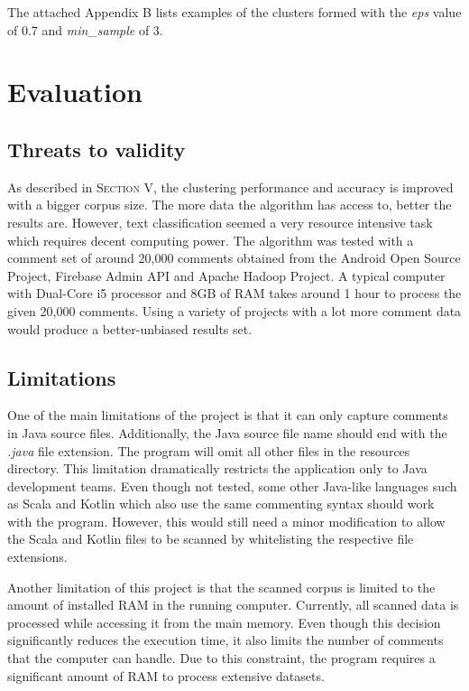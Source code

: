 \documentclass[conference]{IEEEtran}
\begin{document}
The attached Appendix B lists examples of the clusters formed with the \textit{eps} value of 0.7 and \textit{min\_sample} of 3.

\section{Evaluation}

\subsection{Threats to validity}

As described in \textsc{Section V}, the clustering performance and accuracy is improved with a bigger corpus size. The more data the algorithm has access to, better the results are. However, text classification seemed a very resource intensive task which requires decent computing power. The algorithm was tested with a comment set of around 20,000 comments obtained from the Android Open Source Project, Firebase Admin API and Apache Hadoop Project. A typical computer with Dual-Core i5 processor and 8GB of RAM takes around 1 hour to process the given 20,000 comments. Using a variety of projects with a lot more comment data would produce a better-unbiased results set.

\subsection{Limitations}

One of the main limitations of the project is that it can only capture comments in Java source files. Additionally, the Java source file name should end with the \textit{.java} file extension. The program will omit all other files in the resources directory. This limitation dramatically restricts the application only to Java development teams. Even though not tested, some other Java-like languages such as Scala and Kotlin which also use the same commenting syntax should work with the program. However, this would still need a minor modification to allow the Scala and Kotlin files to be scanned by whitelisting the respective file extensions. 

Another limitation of this project is that the scanned corpus is limited to the amount of installed RAM in the running computer. Currently, all scanned data is processed while accessing it from the main memory. Even though this decision significantly reduces the execution time, it also limits the number of comments that the computer can handle. Due to this constraint, the program requires a significant amount of RAM to process extensive datasets. 
\end{document}

